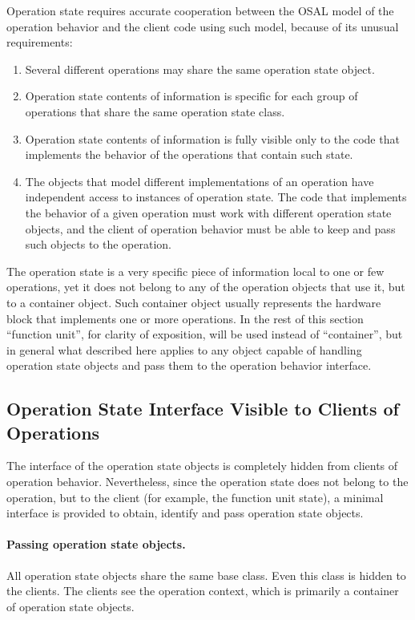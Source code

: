 \documentclass[twoside]{tce}
\begin{document}
Operation state requires accurate cooperation between the OSAL model of the
operation behavior and the client code using such model, because of its
unusual requirements:
\begin{enumerate}
\item %
  Several different operations may share the same operation state object.
\item %
  Operation state contents of information is specific for each group of
  operations that share the same operation state class.
\item %
  Operation state contents of information is fully visible only to the code
  that implements the behavior of the operations that contain such state.
\item %
  The objects that model different implementations of an operation have
  independent access to instances of operation state.  The code that
  implements the behavior of a given operation must work with different
  operation state objects, and the client of operation behavior must be
  able to keep and pass such objects to the operation.
\end{enumerate}

The operation state is a very specific piece of information local to one or
few operations, yet it does not belong to any of the operation objects that
use it, but to a container object.  Such container object usually represents
the hardware block that implements one or more operations.  In the rest of
this section ``function unit'', for clarity of exposition, will be used
instead of ``container'', but in general what described here applies to any
object capable of handling operation state objects and pass them to the
operation behavior interface.


\subsection{Operation State Interface Visible to Clients of Operations}

The interface of the operation state objects is completely hidden from
clients of operation behavior.
%
Nevertheless, since the operation state does not belong to the operation,
but to the client (for example, the function unit state), a minimal
interface is provided to obtain, identify and pass operation state objects.

\paragraph{Passing operation state objects.}
All operation state objects share the same base class.  Even this class is
hidden to the clients.  The clients see the operation context, which is
primarily a container of operation state objects.
\end{document}

